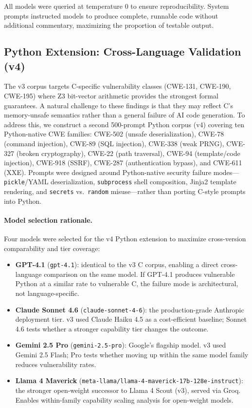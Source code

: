 \documentclass[10pt,twocolumn]{article}
\begin{document}
All models were queried at temperature 0 to ensure reproducibility.
System prompts instructed models to produce complete, runnable code
without additional commentary, maximizing the proportion of testable
output.

\subsection{Python Extension: Cross-Language Validation (v4)}

The v3 corpus targets C-specific vulnerability classes (CWE-131, CWE-190,
CWE-195) where Z3 bit-vector arithmetic provides the strongest formal
guarantees. A natural challenge to these findings is that they may reflect
C's memory-unsafe semantics rather than a general failure of AI code
generation. To address this, we construct a second 500-prompt Python corpus
(v4) covering ten Python-native CWE families: CWE-502 (unsafe
deserialization), CWE-78 (command injection), CWE-89 (SQL injection),
CWE-338 (weak PRNG), CWE-327 (broken cryptography), CWE-22 (path
traversal), CWE-94 (template/code injection), CWE-918 (SSRF), CWE-287
(authentication bypass), and CWE-611 (XXE). Prompts were designed around
Python-native security failure modes---\texttt{pickle}/YAML deserialization,
\texttt{subprocess} shell composition, Jinja2 template rendering, and
\texttt{secrets} vs.\ \texttt{random} misuse---rather than porting C-style
prompts into Python.

\paragraph{Model selection rationale.}
Four models were selected for the v4 Python extension to maximize
cross-version comparability and tier coverage:

\begin{itemize}
  \item \textbf{GPT-4.1} (\texttt{gpt-4.1}): identical to the v3 C corpus,
    enabling a direct cross-language comparison on the same model. If
    GPT-4.1 produces vulnerable Python at a similar rate to vulnerable C,
    the failure mode is architectural, not language-specific.
  \item \textbf{Claude Sonnet 4.6} (\texttt{claude-sonnet-4-6}): the
    production-grade Anthropic deployment tier. v3 used Claude Haiku 4.5 as
    a cost-efficient baseline; Sonnet 4.6 tests whether a stronger
    capability tier changes the outcome.
  \item \textbf{Gemini 2.5 Pro} (\texttt{gemini-2.5-pro}): Google's
    flagship model. v3 used Gemini 2.5 Flash; Pro tests whether moving up
    within the same model family reduces vulnerability rates.
  \item \textbf{Llama 4 Maverick}
    (\texttt{meta-llama/llama-4-maverick-17b-128e-instruct}): the stronger
    open-weight successor to Llama 4 Scout (v3), served via Groq. Enables
    within-family capability scaling analysis for open-weight models.
\end{itemize}
\end{document}
